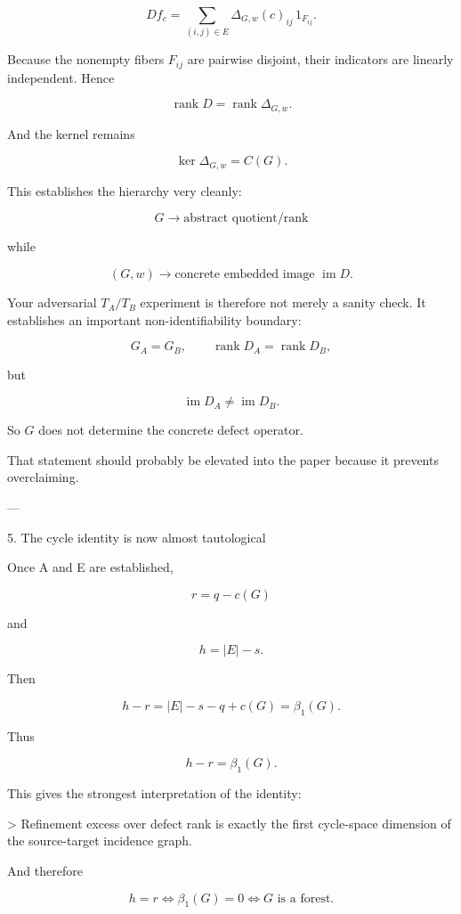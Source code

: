 \[
Df_c  
=  
\sum_{(i,j)\in E}  
\Delta_{G,w}(c)_{ij}  
\,1_{F_{ij}}.  
\]

Because the nonempty fibers \(F_{ij}\) are pairwise disjoint, their indicators are linearly independent. Hence

\[
\operatorname{rank}D  
=  
\operatorname{rank}\Delta_{G,w}.  
\]

And the kernel remains

\[
\ker\Delta_{G,w}=C(G).  
\]

This establishes the hierarchy very cleanly:

\[
\boxed{  
G  
\longrightarrow  
\text{abstract quotient/rank}  
}  
\]

while

\[
\boxed{  
(G,w)  
\longrightarrow  
\text{concrete embedded image } \operatorname{im}D.  
}  
\]

Your adversarial \(T_A/T_B\) experiment is therefore not merely a sanity check. It establishes an important non-identifiability boundary:

\[
G_A=G_B,\qquad  
\operatorname{rank}D_A=\operatorname{rank}D_B,  
\]

but

\[
\operatorname{im}D_A\neq\operatorname{im}D_B.  
\]

So \(G\) does not determine the concrete defect operator.

That statement should probably be elevated into the paper because it prevents overclaiming.


---

5. The cycle identity is now almost tautological



Once A and E are established,

\[
r=q-c(G)  
\]

and

\[
h=|E|-s.  
\]

Then

\[
h-r  
=  
|E|-s-q+c(G)  
=  
\beta_1(G).  
\]

Thus

\[
\boxed{h-r=\beta_1(G)}.  
\]

This gives the strongest interpretation of the identity:

> Refinement excess over defect rank is exactly the first cycle-space dimension of the source-target incidence graph.



And therefore

\[
h=r  
\iff  
\beta_1(G)=0  
\iff  
G\text{ is a forest}.  
\]


